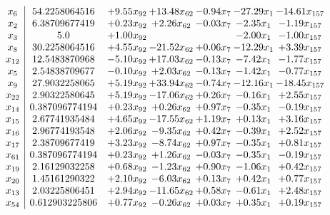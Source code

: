 \documentclass[8pt]{article}
\begin{document}
\[\begin{array}{c| c c@{\hskip 2pt} c@{\hskip 2pt} c@{\hskip 2pt} c@{\hskip 2pt} c@{\hskip 2pt} }
 x_{6}   &  54.2258064516 & +  9.55 x_{92} & + 13.48 x_{62} & -0.94 x_{7} & -27.29 x_{1} & -14.61 x_{157}\\
 x_{2}   &  6.38709677419 & +  0.23 x_{92} & +  2.26 x_{62} & -0.03 x_{7} & -2.35 x_{1} & -1.19 x_{157}\\
 x_{3}   &  5.0 & +  1.00 x_{92} &    &   & -2.00 x_{1} & -1.00 x_{157}\\
 x_{8}   &  30.2258064516 & +  4.55 x_{92} & -21.52 x_{62} & +  0.06 x_{7} & -12.29 x_{1} & +  3.39 x_{157}\\
 x_{12}   &  12.5483870968 & -5.10 x_{92} & + 17.03 x_{62} & -0.13 x_{7} & -7.42 x_{1} & -1.77 x_{157}\\
 x_{5}   &  2.54838709677 & -0.10 x_{92} & +  2.03 x_{62} & -0.13 x_{7} & -1.42 x_{1} & -0.77 x_{157}\\
 x_{9}   &  27.9032258065 & +  5.19 x_{92} & + 33.94 x_{62} & -0.74 x_{7} & -12.16 x_{1} & -18.45 x_{157}\\
 x_{22}   &  2.90322580645 & +  5.19 x_{92} & -17.06 x_{62} & +  0.26 x_{7} & -0.16 x_{1} & +  2.55 x_{157}\\
 x_{14}   &  0.387096774194 & +  0.23 x_{92} & +  0.26 x_{62} & +  0.97 x_{7} & -0.35 x_{1} & -0.19 x_{157}\\
 x_{15}   &  2.67741935484 & +  4.65 x_{92} & -17.55 x_{62} & +  1.19 x_{7} & +  0.13 x_{1} & +  3.16 x_{157}\\
 x_{16}   &  2.96774193548 & +  2.06 x_{92} & -9.35 x_{62} & +  0.42 x_{7} & -0.39 x_{1} & +  2.52 x_{157}\\
 x_{17}   &  2.38709677419 & +  3.23 x_{92} & -8.74 x_{62} & +  0.97 x_{7} & -0.35 x_{1} & +  0.81 x_{157}\\
 x_{61}   &  0.387096774194 & +  0.23 x_{92} & +  1.26 x_{62} & -0.03 x_{7} & -0.35 x_{1} & -0.19 x_{157}\\
 x_{19}   &  2.16129032258 & +  0.68 x_{92} & -1.23 x_{62} & +  0.90 x_{7} & -1.06 x_{1} & +  0.42 x_{157}\\
 x_{20}   &  1.45161290322 & +  2.10 x_{92} & -6.03 x_{62} & +  0.13 x_{7} & +  0.42 x_{1} & +  0.77 x_{157}\\
 x_{13}   &  2.03225806451 & +  2.94 x_{92} & -11.65 x_{62} & +  0.58 x_{7} & -0.61 x_{1} & +  2.48 x_{157}\\
 x_{54}   &  0.612903225806 & +  0.77 x_{92} & -0.26 x_{62} & +  0.03 x_{7} & +  0.35 x_{1} & +  0.19 x_{157}\\

\end{array}\]
\end{document}
